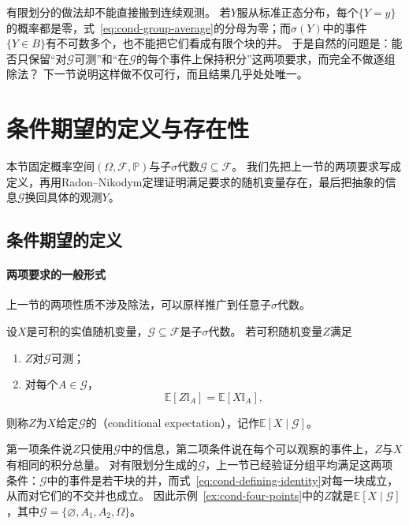 有限划分的做法却不能直接搬到连续观测。
若$Y$服从标准正态分布，每个$\{Y=y\}$的概率都是零，式~\eqref{eq:cond-group-average}的分母为零；而$\sigma(Y)$中的事件$\{Y\in B\}$有不可数多个，也不能把它们看成有限个块的并。
于是自然的问题是：能否只保留“对$\mathcal G$可测”和“在$\mathcal G$的每个事件上保持积分”这两项要求，而完全不做逐组除法？
下一节说明这样做不仅可行，而且结果几乎处处唯一。

\section{条件期望的定义与存在性}
\label{sec:cond-definition}

本节固定概率空间$(\Omega,\mathcal F,\mathbb P)$与子$\sigma$代数$\mathcal G\subseteq\mathcal F$。
我们先把上一节的两项要求写成定义，再用Radon--Nikodym定理证明满足要求的随机变量存在，最后把抽象的信息$\mathcal G$换回具体的观测$Y$。

\subsection{条件期望的定义}

\paragraph{两项要求的一般形式}
上一节的两项性质不涉及除法，可以原样推广到任意子$\sigma$代数。

\begin{definition}[条件期望]
\label{def:cond-expectation}
设$X$是可积的实值随机变量，$\mathcal G\subseteq\mathcal F$是子$\sigma$代数。
若可积随机变量$Z$满足
\begin{enumerate}
  \item $Z$对$\mathcal G$可测；
  \item 对每个$A\in\mathcal G$，
  \begin{equation}
    \mathbb E[Z\mathbb I_A]=\mathbb E[X\mathbb I_A],
    \label{eq:cond-defining-identity}
  \end{equation}
\end{enumerate}
则称$Z$为$X$给定$\mathcal G$的（conditional expectation），记作$\mathbb E[X\mid\mathcal G]$。
\end{definition}

第一项条件说$Z$只使用$\mathcal G$中的信息，第二项条件说在每个可以观察的事件上，$Z$与$X$有相同的积分总量。
对有限划分生成的$\mathcal G$，上一节已经验证分组平均满足这两项条件：$\mathcal G$中的事件是若干块的并，而式~\eqref{eq:cond-defining-identity}对每一块成立，从而对它们的不交并也成立。
因此示例~\ref{ex:cond-four-points}中的$Z$就是$\mathbb E[X\mid\mathcal G]$，其中$\mathcal G=\{\varnothing,A_1,A_2,\Omega\}$。

